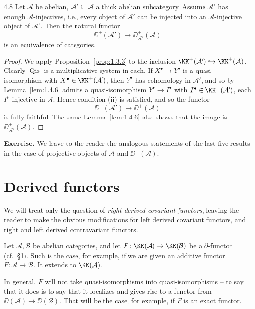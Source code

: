 \begin{bookproposition}{4.8}\label{prop:1.4.8}
Let $\mathcal{A}$ be abelian, $\mathcal{A}'\subseteq\mathcal{A}$ a thick abelian subcategory. Assume $\mathcal{A}'$ has enough $\mathcal{A}$-injectives, i.e., every object of $\mathcal{A}'$ can be injected into an
$\mathcal{A}$-injective object of $\mathcal{A}'$. Then the natural functor
\[
\DD^+(\mathcal{A}') \to \DD_{\mathcal{A}'}^+(\mathcal{A})
\]
is an equivalence of categories.
\end{bookproposition}

\begin{proof}
We apply Proposition~\ref{prop:1.3.3} to the inclusion $\KK^+(\mathcal{A}')\hookrightarrow\KK^+(\mathcal{A})$. Clearly $\operatorname{Qis}$ is a multiplicative system in each. If $X^\bullet\to Y^\bullet$ is a quasi-isomorphism with $X^\bullet\in\KK^+(\mathcal{A}')$, then $Y^\bullet$ has cohomology in $\mathcal{A}'$, and so by Lemma~\ref{lem:1.4.6} admits a quasi-isomorphism $Y^\bullet\to I^\bullet$ with $I^\bullet\in\KK^+(\mathcal{A}')$, each $I^p$ injective in $\mathcal{A}$. Hence condition (ii) is satisfied, and so the functor
\[
\DD^+(\mathcal{A}') \longrightarrow \DD^+(\mathcal{A})
\]
is fully faithful. The same Lemma~\ref{lem:1.4.6} also shows that the image is $\DD_{\mathcal{A}'}^+(\mathcal{A})$.
\end{proof}

\textbf{Exercise.} We leave to the reader the analogous statements of the last five results in the case of projective objects of $\mathcal{A}$ and $\DD^-(\mathcal{A})$.

\section{Derived functors}\label{sec:1.5}

We will treat only the question of \emph{right derived covariant functors}, leaving the reader to make the obvious modifications for left derived covariant functors, and right and left derived contravariant functors.

Let $\mathcal{A},\mathcal{B}$ be abelian categories, and let $F\colon\KK(\mathcal{A})\to\KK(\mathcal{B})$ be a $\partial$-functor (cf.\ \S1). Such is the case, for example, if we are given an additive functor $F\colon\mathcal{A}\to\mathcal{B}$. It extends to $\KK(\mathcal{A})$.

In general, $F$ will not take quasi-isomorphisms into quasi-isomorphisms -- to say that it does is to say that it localizes
and gives rise to a functor from  $\DD(\mathcal{A})\to\DD(\mathcal{B})$. That will be the
case, for example, if $F$ is an exact functor.

